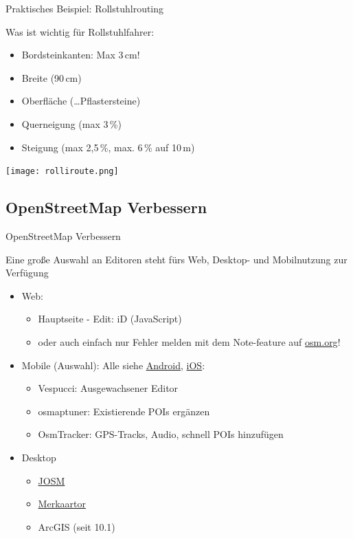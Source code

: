 \documentclass{beamer}
\begin{document}
\begin{frame}{Praktisches Beispiel: Rollstuhlrouting}

Was ist wichtig für Rollstuhlfahrer:

\begin{itemize}
  \item Bordsteinkanten: Max 3\,cm!
  \item Breite (90\,cm)
  \item Oberfläche (\dots Pflastersteine)
  \item Querneigung (max 3\,\%)
  \item Steigung (max 2,5\,\%, max. 6\,\% auf 10\,m)
\end{itemize}

\texttt{[image: rolliroute.png]}

\end{frame}


  \subsection{ OpenStreetMap Verbessern}

\begin{frame}{OpenStreetMap Verbessern}

  Eine große Auswahl an Editoren steht fürs Web, Desktop- und Mobilnutzung zur Verfügung

  \begin{itemize}
    \item Web:
    \begin{itemize}
	    \item Hauptseite - Edit: iD (JavaScript)
      \item oder auch einfach nur Fehler melden mit dem Note-feature auf \href{http://osm.org}{osm.org}!
	      \pause
    \end{itemize}
    \item Mobile (Auswahl): Alle siehe  \href{http://wiki.openstreetmap.org/wiki/Android\#OpenStreetMap\_editing\_features}{Android}, \href{http://wiki.openstreetmap.org/wiki/Apple\_iOS\#OpenStreetMap\_editing\_features}{iOS}:
    \begin{itemize}
      \item Vespucci: Ausgewachsener Editor
      \item osmaptuner: Existierende POIs ergänzen
      \item OsmTracker: GPS-Tracks, Audio, schnell POIs hinzufügen
    \end{itemize}
  \item Desktop
    \begin{itemize}
      \item \href{http://josm.openstreetmap.de}{JOSM}
      \item \href{http://merkaartor.be}{Merkaartor}
      \item ArcGIS (seit 10.1)
    \end{itemize}
  \end{itemize}

\end{frame}
\end{document}
